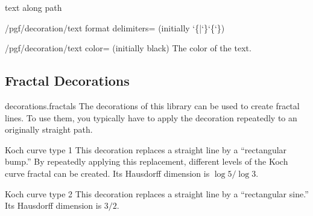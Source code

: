 \begin{decoration}{text along path}
{\begin{key}{/pgf/decoration/text format delimiters= (initially \char`\{|\char`\}\char`\{\char`\})}
\begin{codeexample}[]
\end{codeexample}
  \end{key}
}

  \begin{key}{/pgf/decoration/text color=  (initially black)}
    The color of the text.
  \end{key}
\end{decoration}





\subsection{Fractal Decorations}

\begin{pgflibrary}{decorations.fractals}
  The decorations of this library can be used to create fractal
  lines. To use them, you typically have to apply the decoration
  repeatedly to an originally straight path.
\end{pgflibrary}


\begin{decoration}{Koch curve type 1}
  This decoration replaces a straight line by a ``rectangular bump.''
  By repeatedly applying this replacement, different levels of the
  Koch curve fractal can be created. Its Hausdorff dimension is $\log
  5/\log 3$.
\begin{codeexample}[]
\end{codeexample}
\end{decoration}


\begin{decoration}{Koch curve type 2}
  This decoration replaces a straight line by a ``rectangular sine.''
  Its Hausdorff dimension is $3/2$.
\begin{codeexample}[]
\end{codeexample}
\end{decoration}

